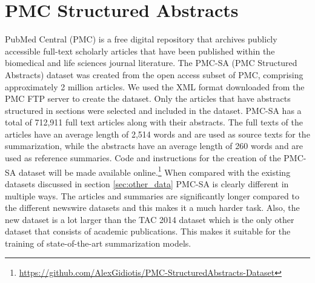 \documentclass[runningheads]{llncs}
\begin{document}

\section{PMC Structured Abstracts}

PubMed Central (PMC) is a free digital repository that archives publicly accessible full-text scholarly articles that have been published within the biomedical and life sciences journal literature. The PMC-SA (PMC Structured Abstracts) dataset was created from the open access subset of PMC, comprising approximately 2 million articles. We used the XML format downloaded from the PMC FTP server to create the dataset. Only the articles that have abstracts structured in sections were selected and included in the dataset. PMC-SA has a total of 712,911 full text articles along with their abstracts. The full texts of the articles have an average length of 2,514 words and are used as source texts for the summarization, while the abstracts have an average length of 260 words and are used as reference summaries. Code and instructions for the creation of the PMC-SA dataset will be made available online.\footnote{\url{https://github.com/AlexGidiotis/PMC-StructuredAbstracts-Dataset}} When compared with the existing datasets discussed in section \ref{sec:other_data} PMC-SA is clearly different in multiple ways. The articles and summaries are significantly longer compared to the different newswire datasets and this makes it a much harder task. Also, the new dataset is a lot larger than the TAC 2014 dataset which is the only other dataset that consists of academic publications. This makes it suitable for the training of state-of-the-art summarization models. 
\end{document}
